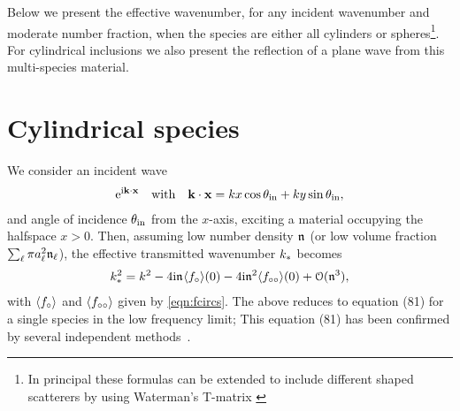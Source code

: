 \documentclass[12pt, a4paper]{article}
\begin{document}
Below we present the effective wavenumber, for any incident wavenumber and moderate number fraction, when the species are either all cylinders or spheres\footnote{In principal these formulas can be extended to include different shaped scatterers by using Waterman's T-matrix \cite{waterman_symmetry_1971,varadan_multiple_1978,mishchenko_t-matrix_1996}}.
  For cylindrical inclusions we also present the reflection of a plane wave from this multi-species material.





\section{Cylindrical species}

We consider an incident wave
\begin{gather}
  \textrm{e}^{\textrm{i} \mathbf k \cdot \mathbf x} \quad \text{with} \quad \mathbf k \cdot \mathbf x = k x \cos \theta_{\mathrm{in}}  + k y \sin \theta_{\mathrm{in}},
  \label{eqns:incident}
\end{gather}
and angle of incidence $\theta_{\mathrm{in}}$ from the $x$-axis, exciting a material occupying the halfspace $x>0$. Then, assuming low number density $\mathfrak n_{}$ (or low volume fraction $\sum_\ell \pi a_\ell^2 \mathfrak n_{\ell}$), the effective transmitted wavenumber $k_*$ becomes
\begin{align}
   k_*^2 = k^2 - 4 \textrm{i} \mathfrak n_{} \langle f_\circ \rangle(0) -  4 \textrm{i} \mathfrak n_{}^2 \langle f_{\circ\circ} \rangle(0)
   + \mathcal O(\mathfrak n_{}^3),
  \label{eqn:SmallNfracDiscrete}
\end{align}
with $\langle f_\circ \rangle$ and $\langle f_{\circ\circ} \rangle$ given by \eqref{eqn:fcircs}. The above reduces to \cite{linton_multiple_2005} equation (81) for a single species in the low frequency limit; This equation (81) has been confirmed by several independent methods~\cite{martin_estimating_2010,martin_multiple_2008,chekroun_time-domain_2012,kim_models_2010}.
\end{document}
